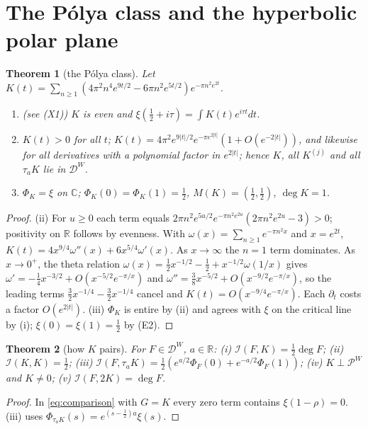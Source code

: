 \documentclass[11pt]{amsart}
\newtheorem{theorem}{Theorem}[section]
\theoremstyle{definition}
\theoremstyle{remark}
\newcommand{\C}{\mathbb C}
\newcommand{\R}{\mathbb R}
\newcommand{\DW}{\mathcal D^{W}}
\newcommand{\PW}{\mathcal P^{W}}
\newcommand{\I}{\mathcal I}
\newcommand{\dg}{\deg}
\begin{document}
\section{The P\'olya class and the hyperbolic polar plane}\label{sec:polya}

\begin{theorem}[the P\'olya class]\label{thm:K}
Let $K(t)=\sum_{n\ge1}(4\pi^2n^4e^{9t/2}-6\pi n^2e^{5t/2})e^{-\pi n^2e^{2t}}$.
\begin{enumerate}
\item[(i)] (see (X1)) $K$ is even and $\xi(\frac12+i\tau)=\int K(t)e^{i\tau t}dt$.
\item[(ii)] $K(t)>0$ for all $t$; $K(t)=4\pi^2e^{9|t|/2}e^{-\pi e^{2|t|}}(1+O(e^{-2|t|}))$, and
likewise for all derivatives with a polynomial factor in $e^{2|t|}$; hence $K$, all $K^{(j)}$ and all
$\tau_aK$ lie in $\DW$.
\item[(iii)] $\Phi_K=\xi$ on $\C$; $\Phi_K(0)=\Phi_K(1)=\frac12$, $M(K)=(\frac12,\frac12)$, $\dg K=1$.
\end{enumerate}
\end{theorem}
\begin{proof}
(ii) For $u\ge0$ each term equals $2\pi n^2e^{5u/2}e^{-\pi n^2e^{2u}}(2\pi n^2e^{2u}-3)>0$; positivity on
$\R$ follows by evenness. With $\omega(x)=\sum_{n\ge1}e^{-\pi n^2x}$ and $x=e^{2t}$,
$K(t)=4x^{9/4}\omega''(x)+6x^{5/4}\omega'(x)$. As $x\to\infty$ the $n=1$ term dominates. As $x\to0^+$,
the theta relation $\omega(x)=\frac12x^{-1/2}-\frac12+x^{-1/2}\omega(1/x)$ gives
$\omega'=-\frac14x^{-3/2}+O(x^{-5/2}e^{-\pi/x})$ and $\omega''=\frac38x^{-5/2}+O(x^{-9/2}e^{-\pi/x})$,
so the leading terms $\frac32x^{-1/4}-\frac32x^{-1/4}$ cancel and $K(t)=O(x^{-9/4}e^{-\pi/x})$. Each
$\partial_t$ costs a factor $O(e^{2|t|})$. (iii) $\Phi_K$ is entire by (ii) and agrees with $\xi$ on the
critical line by (i); $\xi(0)=\xi(1)=\frac12$ by (E2).
\end{proof}

\begin{theorem}[how $K$ pairs]\label{thm:Kpair}
For $F\in\DW$, $a\in\R$:
(i) $\I(F,K)=\frac12\dg F$; (ii) $\I(K,K)=\frac12$; (iii) $\I(F,\tau_aK)=\frac12(e^{a/2}\Phi_F(0)+e^{-a/2}\Phi_F(1))$;
(iv) $K\perp\PW$ and $K\ne0$; (v) $\I(F,2K)=\dg F$.
\end{theorem}
\begin{proof}
In \eqref{eq:comparison} with $G=K$ every zero term contains $\xi(1-\rho)=0$. (iii) uses
$\Phi_{\tau_aK}(s)=e^{(s-\frac12)a}\xi(s)$.
\end{proof}
\end{document}
